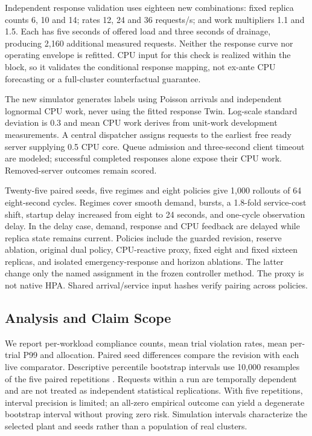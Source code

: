 \documentclass[10pt,twocolumn,a4paper]{article}
\begin{document}
Independent response validation uses eighteen new combinations: fixed replica counts 6, 10 and 14; rates 12, 24 and 36 requests/s; and work multipliers 1.1 and 1.5. Each has five seconds of offered load and three seconds of drainage, producing 2,160 additional measured requests. Neither the response curve nor operating envelope is refitted. CPU input for this check is realized within the block, so it validates the conditional response mapping, not ex-ante CPU forecasting or a full-cluster counterfactual guarantee.

The new simulator generates labels using Poisson arrivals and independent lognormal CPU work, never using the fitted response Twin. Log-scale standard deviation is 0.3 and mean CPU work derives from unit-work development measurements. A central dispatcher assigns requests to the earliest free ready server supplying 0.5 CPU core. Queue admission and three-second client timeout are modeled; successful completed responses alone expose their CPU work. Removed-server outcomes remain scored.

Twenty-five paired seeds, five regimes and eight policies give 1,000 rollouts of 64 eight-second cycles. Regimes cover smooth demand, bursts, a 1.8-fold service-cost shift, startup delay increased from eight to 24 seconds, and one-cycle observation delay. In the delay case, demand, response and CPU feedback are delayed while replica state remains current. Policies include the guarded revision, reserve ablation, original dual policy, CPU-reactive proxy, fixed eight and fixed sixteen replicas, and isolated emergency-response and horizon ablations. The latter change only the named assignment in the frozen controller method. The proxy is not native HPA. Shared arrival/service input hashes verify pairing across policies.

\subsection{Analysis and Claim Scope}
We report per-workload compliance counts, mean trial violation rates, mean per-trial P99 and allocation. Paired seed differences compare the revision with each live comparator. Descriptive percentile bootstrap intervals use 10,000 resamples of the five paired repetitions \cite{bootstrap}. Requests within a run are temporally dependent and are not treated as independent statistical replications. With five repetitions, interval precision is limited; an all-zero empirical outcome can yield a degenerate bootstrap interval without proving zero risk. Simulation intervals characterize the selected plant and seeds rather than a population of real clusters.
\end{document}
